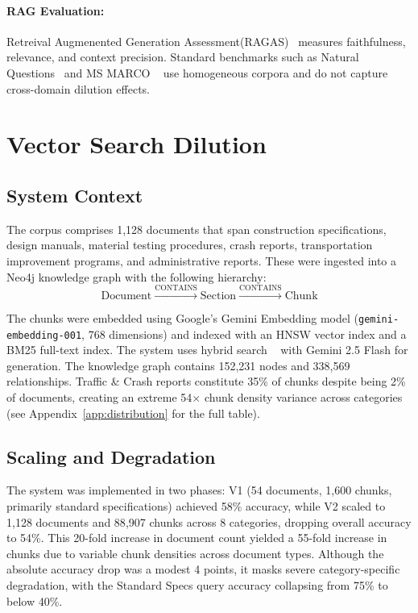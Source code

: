 \documentclass{article}
\newcommand{\numDocs}{1{,}128}
\newcommand{\numChunks}{88{,}907}
\begin{document}
\paragraph{RAG Evaluation:}
Retreival Augmenented Generation Assessment(RAGAS)~\citep{es2024ragas} measures faithfulness, relevance, and context precision. Standard benchmarks such as Natural Questions~\citep{kwiatkowski2019natural} and MS MARCO ~\citep{nguyen2016msmarco} use homogeneous corpora and do not capture cross-domain dilution effects.

\section{Vector Search Dilution}
\label{sec:dilution}

\subsection{System Context}

The corpus comprises \numDocs{} documents that span construction specifications, design manuals, material testing procedures, crash reports, transportation improvement programs, and administrative reports. These were ingested into a Neo4j knowledge graph with the following hierarchy:
\begin{equation}
\text{Document} \xrightarrow{\text{CONTAINS}} \text{Section} \xrightarrow{\text{CONTAINS}} \text{Chunk}
\end{equation}

The chunks were embedded using Google's Gemini Embedding model (\texttt{gemini-embedding-001}, 768 dimensions) and indexed with an HNSW vector index and a BM25 full-text index. The system uses hybrid search ~\citep{sawarkar2024blended} with Gemini 2.5 Flash for generation. The knowledge graph contains 152,231 nodes and 338,569 relationships.
Traffic \& Crash reports constitute 35\% of chunks despite being 2\% of documents, creating an extreme 54$\times$ chunk density variance across categories (see Appendix~\ref{app:distribution} for the full table).


\subsection{Scaling and Degradation}

The system was implemented in two phases: V1 (54 documents, 1,600 chunks, primarily standard specifications) achieved 58\% accuracy, while V2 scaled to \numDocs{} documents and \numChunks{} chunks across 8 categories, dropping overall accuracy to 54\%. This 20-fold increase in document count yielded a 55-fold increase in chunks due to variable chunk densities across document types. Although the absolute accuracy drop was a modest 4 points, it masks severe category-specific degradation, with the Standard Specs query accuracy collapsing from 75\% to below 40\%.
\end{document}
